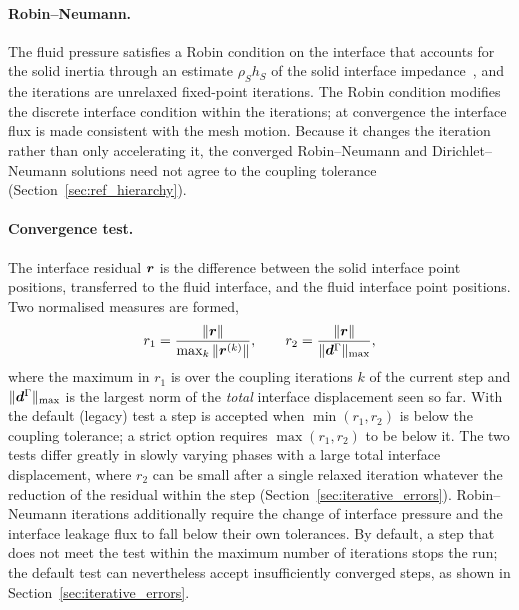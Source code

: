\paragraph{Robin--Neumann.}
The fluid pressure satisfies a Robin condition on the interface that accounts for the solid inertia through an estimate $\rho_S h_S$ of the solid interface impedance~\citep{BadiaNobile2008, Tukovic2018b}, and the iterations are unrelaxed fixed-point iterations.
The Robin condition modifies the discrete interface condition within the iterations; at convergence the interface flux is made consistent with the mesh motion.
Because it changes the iteration rather than only accelerating it, the converged Robin--Neumann and Dirichlet--Neumann solutions need not agree to the coupling tolerance (Section~\ref{sec:ref_hierarchy}).

\paragraph{Convergence test.}
The interface residual $\boldsymbol{r}$ is the difference between the solid interface point positions, transferred to the fluid interface, and the fluid interface point positions.
Two normalised measures are formed,
\begin{equation}
	r_1 = \frac{\|\boldsymbol{r}\|}{\max_k \|\boldsymbol{r}^{(k)}\|},
	\qquad
	r_2 = \frac{\|\boldsymbol{r}\|}{\|\boldsymbol{d}^\Gamma\|_{\max}},
	\label{eq:coupling_residuals}
\end{equation}
where the maximum in $r_1$ is over the coupling iterations $k$ of the current step and $\|\boldsymbol{d}^\Gamma\|_{\max}$ is the largest norm of the \emph{total} interface displacement seen so far.
With the default (legacy) test a step is accepted when $\min(r_1, r_2)$ is below the coupling tolerance; a strict option requires $\max(r_1, r_2)$ to be below it.
The two tests differ greatly in slowly varying phases with a large total interface displacement, where $r_2$ can be small after a single relaxed iteration whatever the reduction of the residual within the step (Section~\ref{sec:iterative_errors}).
Robin--Neumann iterations additionally require the change of interface pressure and the interface leakage flux to fall below their own tolerances.
By default, a step that does not meet the test within the maximum number of iterations stops the run; the default test can nevertheless accept insufficiently converged steps, as shown in Section~\ref{sec:iterative_errors}.


